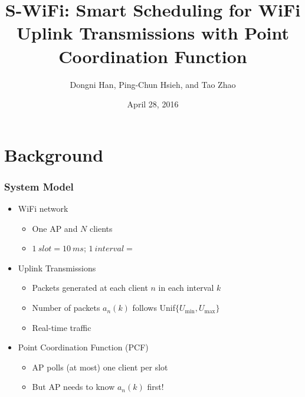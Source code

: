 \documentclass{beamer}
\begin{document}
\title{S-WiFi: Smart Scheduling for WiFi Uplink Transmissions with Point Coordination Function}
\author{Dongni Han, Ping-Chun Hsieh, and Tao Zhao}
\date{April 28, 2016}
\newtheorem{thm}{Theorem}
\begin{frame}
\titlepage
\end{frame}





\section{Background}

\begin{frame}
\frametitle{System Model}
\begin{itemize}
  \item WiFi network
    \begin{itemize}
      \item One AP and $N$ clients
      \item $\SI{1}{slot} = \SI{10}{ms}$; $\SI{1}{interval} =$ 
    \end{itemize}
  \item Uplink Transmissions
    \begin{itemize}
      \item Packets generated at each client $n$ in each interval $k$
      \item Number of packets $a_n(k)$ follows Unif$\{U_\text{min}, U_\text{max}\}$
      \item Real-time traffic
    \end{itemize}
  \item Point Coordination Function (PCF)
    \begin{itemize}
      \item AP polls (at most) one client per slot
      \item But AP needs to know $a_n(k)$ first!
    \end{itemize}
\end{itemize}
\end{frame}
\end{document}
